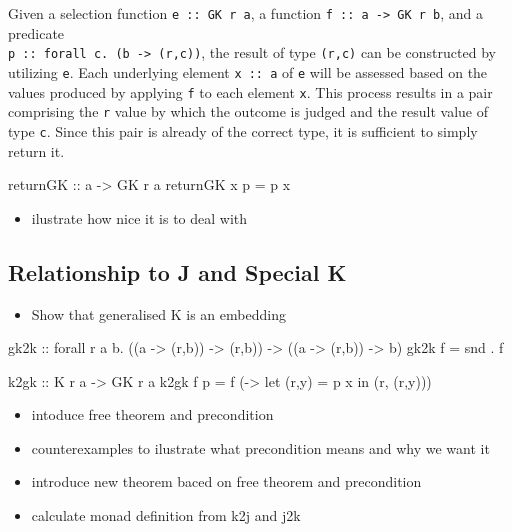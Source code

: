 \documentclass[runningheads]{llncs}
\providecommand{\tightlist}{%
  \setlength{\itemsep}{0pt}\setlength{\parskip}{0pt}}
\begin{document}
Given a selection function \texttt{e\ ::\ GK\ r\ a}, a function
\texttt{f\ ::\ a\ -\textgreater{}\ GK\ r\ b}, and a predicate\\
\texttt{p\ ::\ forall\ c.\ (b\ -\textgreater{}\ (r,c))}, the result of
type \texttt{(r,c)} can be constructed by utilizing \texttt{e}. Each
underlying element \texttt{x\ ::\ a} of \texttt{e} will be assessed
based on the values produced by applying \texttt{f} to each element
\texttt{x}. This process results in a pair comprising the \texttt{r}
value by which the outcome is judged and the result value of type
\texttt{c}. Since this pair is already of the correct type, it is
sufficient to simply return it.

\begin{code}
returnGK :: a -> GK r a
returnGK x p = p x
\end{code}

\begin{itemize}
\tightlist
\item
  ilustrate how nice it is to deal with
\end{itemize}

\subsection{Relationship to J and Special
K}\label{relationship-to-j-and-special-k}

\begin{itemize}
\tightlist
\item
  Show that generalised K is an embedding
\end{itemize}

\begin{code}
gk2k :: forall r a b. ((a -> (r,b)) -> (r,b)) -> ((a -> (r,b)) -> b)
gk2k f = snd . f
\end{code}

\begin{code}
k2gk :: K r a -> GK r a
k2gk f p = f (\x -> let (r,y) = p x in (r, (r,y)))
\end{code}

\begin{itemize}
\tightlist
\item
  intoduce free theorem and precondition
\item
  counterexamples to ilustrate what precondition means and why we want
  it
\item
  introduce new theorem baced on free theorem and precondition
\item
  calculate monad definition from k2j and j2k
\end{itemize}
\end{document}
